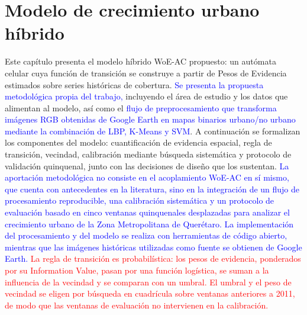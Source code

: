 \graphicspath{{figures/}{../figures/}}

\chapter{Modelo de crecimiento urbano híbrido}
\label{ch:modelo-crecimiento-urbano}

\begin{resumen}
Este capítulo presenta el modelo híbrido WoE-AC propuesto: un autómata celular cuya función de transición se construye a partir de Pesos de Evidencia estimados sobre series históricas de cobertura. \textcolor{blue}{Se presenta la propuesta metodológica propia del trabajo,} incluyendo el área de estudio y los datos que alimentan al modelo, así como el \textcolor{blue}{flujo de preprocesamiento que transforma imágenes RGB obtenidas de Google Earth en mapas binarios urbano/no urbano mediante la combinación de LBP, K-Means y SVM}. A continuación se formalizan los componentes del modelo: cuantificación de evidencia espacial, regla de transición, vecindad, calibración mediante búsqueda sistemática y protocolo de validación quinquenal, junto con las decisiones de diseño que los sustentan. \textcolor{blue}{La aportación metodológica no consiste en el acoplamiento WoE-AC en sí mismo, que cuenta con antecedentes en la literatura, sino en la integración de un flujo de procesamiento reproducible, una calibración sistemática y un protocolo de evaluación basado en cinco ventanas quinquenales desplazadas para analizar el crecimiento urbano de la Zona Metropolitana de Querétaro. La implementación del procesamiento y del modelo se realiza con herramientas de código abierto, mientras que las imágenes históricas utilizadas como fuente se obtienen de Google Earth.} \textcolor{red}{La regla de transición es probabilística: los pesos de evidencia, ponderados por su Information Value, pasan por una función logística, se suman a la influencia de la vecindad y se comparan con un umbral. El umbral y el peso de vecindad se eligen por búsqueda en cuadrícula sobre ventanas anteriores a 2011, de modo que las ventanas de evaluación no intervienen en la calibración.}
\end{resumen}


